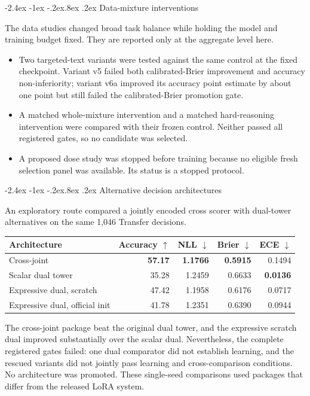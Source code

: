 \documentclass[10pt]{article}
\makeatletter
\renewcommand\subsection{\@startsection{subsection}{2}{\z@}%
  {-2.4ex \@plus -1ex \@minus -.2ex}{.8ex \@plus .2ex}%
  {\color{blue}\large\bfseries}}
\newcommand{\good}[1]{\textcolor{mint!60!black}{\textbf{#1}}}
\makeatother
\begin{document}
\subsection{Data-mixture interventions}

The data studies changed broad task balance while holding the model and training
budget fixed. They are reported only at the aggregate level here.

\begin{itemize}
  \item Two targeted-text variants were tested against the same control at the
  fixed checkpoint. Variant v5 failed both calibrated-Brier improvement and
  accuracy non-inferiority; variant v6a improved its accuracy point estimate by
  about one point but still failed the calibrated-Brier promotion gate.
  \item A matched whole-mixture intervention and a matched hard-reasoning
  intervention were compared with their frozen control. Neither passed all
  registered gates, so no candidate was selected.
  \item A proposed dose study was stopped before training because no eligible
  fresh selection panel was available. Its status is a stopped protocol.
\end{itemize}

\subsection{Alternative decision architectures}

An exploratory route compared a jointly encoded cross scorer with dual-tower
alternatives on the same 1,046 Transfer decisions.

\begin{tabular}{p{.32\linewidth}rrrr}
\toprule
Architecture & Accuracy $\uparrow$ & NLL $\downarrow$ & Brier $\downarrow$ & ECE $\downarrow$ \\
\midrule
Cross-joint & \good{57.17} & \good{1.1766} & \good{0.5915} & 0.1494 \\
Scalar dual tower & 35.28 & 1.2459 & 0.6633 & \good{0.0136} \\
Expressive dual, scratch & 47.42 & 1.1958 & 0.6176 & 0.0717 \\
Expressive dual, official init & 41.78 & 1.2351 & 0.6390 & 0.0944 \\
\bottomrule
\end{tabular}

The cross-joint package beat the original dual tower, and the expressive scratch
dual improved substantially over the scalar dual. Nevertheless, the complete
registered gates failed: one dual comparator did not establish learning, and the
rescued variants did not jointly pass learning and cross-comparison conditions.
No architecture was promoted. These single-seed comparisons used packages
that differ from the released LoRA system.
\end{document}
